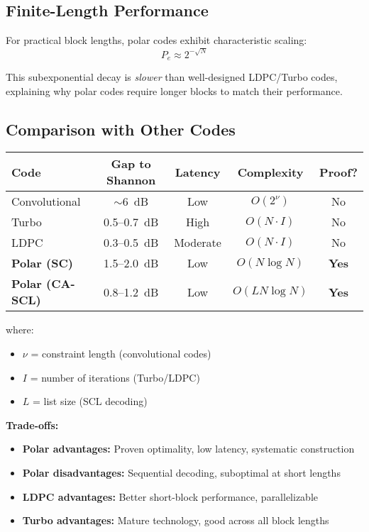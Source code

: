 \subsection{Finite-Length Performance}

For practical block lengths, polar codes exhibit characteristic scaling:
\begin{equation}
P_e \approx 2^{-\sqrt{N}}
\end{equation}

This subexponential decay is \emph{slower} than well-designed LDPC/Turbo codes, explaining why polar codes require longer blocks to match their performance.

\subsection{Comparison with Other Codes}

\begin{center}
\begin{tabular}{@{}lcccc@{}}
\toprule
\textbf{Code} & \textbf{Gap to Shannon} & \textbf{Latency} & \textbf{Complexity} & \textbf{Proof?} \\
\midrule
Convolutional & $\sim$6~dB & Low & $O(2^{\nu})$ & No \\
Turbo & 0.5--0.7~dB & High & $O(N \cdot I)$ & No \\
LDPC & 0.3--0.5~dB & Moderate & $O(N \cdot I)$ & No \\
\textbf{Polar (SC)} & 1.5--2.0~dB & Low & $O(N \log N)$ & \textbf{Yes} \\
\textbf{Polar (CA-SCL)} & 0.8--1.2~dB & Low & $O(L N \log N)$ & \textbf{Yes} \\
\bottomrule
\end{tabular}
\end{center}
where:
\begin{itemize}
\item $\nu$ = constraint length (convolutional codes)
\item $I$ = number of iterations (Turbo/LDPC)
\item $L$ = list size (SCL decoding)
\end{itemize}

\textbf{Trade-offs:}
\begin{itemize}
\item \textbf{Polar advantages:} Proven optimality, low latency, systematic construction
\item \textbf{Polar disadvantages:} Sequential decoding, suboptimal at short lengths
\item \textbf{LDPC advantages:} Better short-block performance, parallelizable
\item \textbf{Turbo advantages:} Mature technology, good across all block lengths
\end{itemize}

